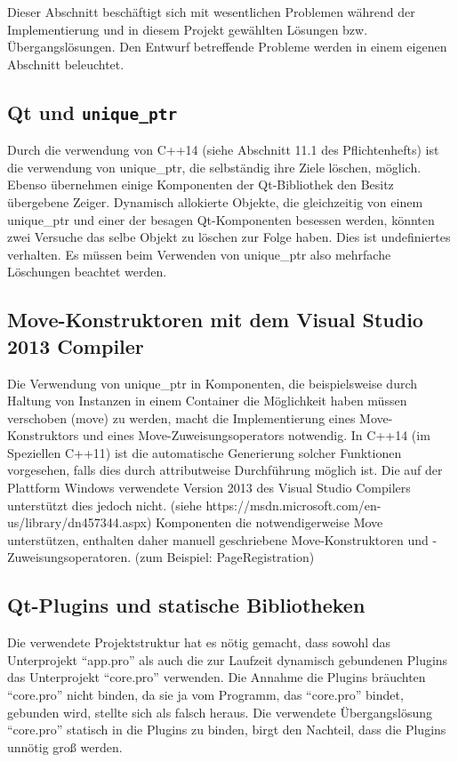 Dieser Abschnitt beschäftigt sich mit wesentlichen Problemen während der 
Implementierung und in diesem Projekt gewählten Lösungen bzw. Übergangslösungen.
Den Entwurf betreffende Probleme werden in einem eigenen Abschnitt beleuchtet.

\subsection{Qt und \texttt{unique\_ptr}}
Durch die verwendung von C++14 (siehe Abschnitt 11.1 des Pflichtenhefts) ist die verwendung von unique\_ptr, die selbständig ihre Ziele löschen, möglich. Ebenso übernehmen einige Komponenten der Qt-Bibliothek den Besitz übergebene Zeiger. Dynamisch allokierte Objekte, die gleichzeitig von einem unique\_ptr und einer der besagen Qt-Komponenten besessen werden, könnten zwei Versuche das selbe Objekt zu löschen zur Folge haben. Dies ist undefiniertes verhalten. Es müssen beim Verwenden von unique\_ptr also mehrfache Löschungen beachtet werden.

\subsection{Move-Konstruktoren mit dem Visual Studio 2013 Compiler}
Die Verwendung von unique\_ptr in Komponenten, die beispielsweise durch Haltung von Instanzen in einem Container die Möglichkeit haben müssen verschoben (move) zu werden, macht die Implementierung eines Move-Konstruktors und eines Move-Zuweisungsoperators notwendig. In C++14 (im Speziellen C++11) ist die automatische Generierung solcher Funktionen vorgesehen, falls dies durch attributweise Durchführung möglich ist. Die auf der Plattform Windows verwendete Version 2013 des Visual Studio Compilers unterstützt dies jedoch nicht. (siehe https://msdn.microsoft.com/en-us/library/dn457344.aspx)
Komponenten die notwendigerweise Move unterstützen, enthalten daher manuell geschriebene Move-Konstruktoren und -Zuweisungsoperatoren. (zum Beispiel: PageRegistration)

\subsection{Qt-Plugins und statische Bibliotheken}
Die verwendete Projektstruktur hat es nötig gemacht, dass sowohl das Unterprojekt \enquote{app.pro} als auch die zur Laufzeit dynamisch gebundenen Plugins das Unterprojekt \enquote{core.pro} verwenden.
Die Annahme die Plugins bräuchten \enquote{core.pro} nicht binden, da sie ja vom Programm, das \enquote{core.pro} bindet, gebunden wird, stellte sich als falsch heraus.
Die verwendete Übergangslösung \enquote{core.pro} statisch in die Plugins zu binden, birgt den Nachteil, dass die Plugins unnötig groß werden.
